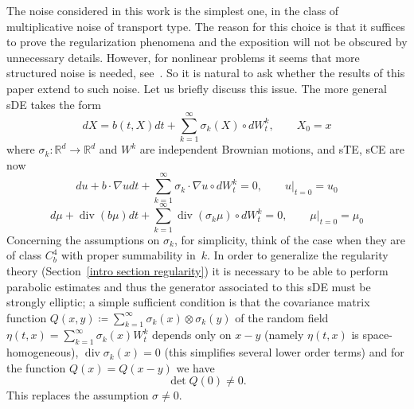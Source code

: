 \documentclass[a4paper,10pt]{article}
\newcommand\1{\mathbbm{1}}
\DeclareMathOperator{\diverg}{div}
\numberwithin{equation}{section}
\begin{document}
The noise considered in this work is the simplest one, in the class of multiplicative noise of transport type. The reason for this choice is that it suffices to prove the regularization phenomena and the exposition will not be obscured by unnecessary details. However, for nonlinear problems it seems that more structured noise is needed, see~\cite{FLAGUBPRI10a,DeFlVi}. So it is natural to ask whether the results of this paper extend to such noise. Let us briefly discuss this issue. The more general sDE takes the form 
\begin{equation}
dX =b( t,X ) dt+\sum_{k=1}^{\infty }\sigma _{k}(X) \circ dW_{t}^{k},\qquad X_{0}=x  \label{SDE general}
\end{equation}
where $\sigma _{k}:\mathbb{R}^{d}\rightarrow \mathbb{R}^{d}$ and $W^{k}$ are
independent Brownian motions, and sTE, sCE are now
\begin{equation}
du+b\cdot \nabla udt+\sum_{k=1}^{\infty }\sigma _{k}\cdot \nabla u\circ dW_{t}^{k}=0,\qquad u|_{t=0}=u_{0}  \label{stoch transport general}\end{equation}
\begin{equation}
d\mu +\diverg ( b \mu ) dt+\sum_{k=1}^{\infty }\diverg  
( \sigma _{k}\mu ) \circ dW_{t}^{k}=0,\qquad \mu |_{t=0}=\mu
_{0}  \label{stoch cont general}
\end{equation} 
Concerning the assumptions on $\sigma _{k}$, for simplicity, think of the case when they are of class $C_{b}^{4}$ with proper summability in~$k$. 
In order to generalize the regularity theory (Section~\ref{intro section regularity}) it is necessary to be able to perform parabolic estimates and
thus the generator associated to this sDE must be strongly elliptic; a simple sufficient condition is that the covariance matrix function $Q(x,y) \coloneqq \sum_{k=1}^{\infty }\sigma _{k}( x) \otimes \sigma_{k}( y) $ of the random field $\eta ( t,x) =\sum_{k=1}^{\infty }\sigma _{k}( x) W_{t}^{k}$ depends only on $x-y$ (namely $\eta ( t,x) $ is space-homogeneous), $\diverg  \sigma _{k}( x) =0$ (this simplifies several lower order terms) and for the function $Q( x) =Q( x-y) $ we have 
\begin{equation*}
\det Q( 0) \neq 0 .
\end{equation*} 
This replaces the assumption $\sigma \neq 0$.
\end{document}
